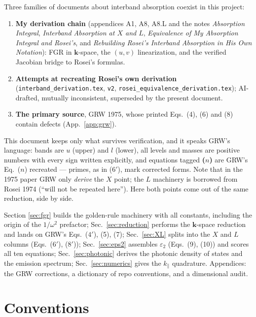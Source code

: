 \documentclass[11pt,a4paper]{article}
\numberwithin{equation}{section}
\newcommand{\kpar}{k_{\parallel}}
\newcommand{\eps}{\varepsilon}
\begin{document}
Three families of documents about interband absorption coexist in this
project:
\begin{enumerate}
\item \textbf{My derivation chain} (appendices A1, A8, A8.L and the
      notes \emph{Absorption Integral}, \emph{Interband Absorption at
      $X$ and $L$}, \emph{Equivalence of My Absorption Integral and
      Rosei's}, and \emph{Rebuilding Rosei's Interband Absorption in
      His Own Notation}): FGR in $\mathbf{k}$-space, the $(u,v)$
      linearization, and the verified Jacobian bridge to Rosei's
      formulas.
\item \textbf{Attempts at recreating Rosei's own derivation}
      (\texttt{interband\_derivation.tex}, \texttt{v2},
      \texttt{rosei\_equivalence\_derivation.tex}); AI-drafted,
      mutually inconsistent, superseded by the present document.
\item \textbf{The primary source}, GRW 1975, whose printed Eqs.~(4),
      (6) and (8) contain defects (App.~\ref{app:grw}).
\end{enumerate}
This document keeps only what survives verification, and it speaks
GRW's language: bands are $u$ (upper) and $l$ (lower), all levels and
masses are positive numbers with every sign written explicitly, and
equations tagged \textbf{($n$)} are GRW's Eq.~($n$) recreated ---
primes, as in ($6'$), mark corrected forms.  Note that in the 1975
paper GRW only \emph{derive} the $X$ point; the $L$ machinery is
borrowed from Rosei 1974 (``will not be repeated here'').  Here both
points come out of the same reduction, side by side.

Section \ref{sec:fgr} builds the golden-rule machinery with all
constants, including the origin of the $1/\omega^2$ prefactor;
Sec.~\ref{sec:reduction} performs the $\mathbf{k}$-space reduction and
lands on GRW's Eqs.~($4'$), (5), (7); Sec.~\ref{sec:XL} splits into
the $X$ and $L$ columns (Eqs.~($6'$), ($8'$)); Sec.~\ref{sec:eps2}
assembles $\eps_2$ (Eqs.~(9), (10)) and scores all ten equations;
Sec.~\ref{sec:photonic} derives the photonic density of states and the
emission spectrum; Sec.~\ref{sec:numerics} gives the $\kpar$
quadrature.  Appendices: the GRW corrections, a dictionary of repo
conventions, and a dimensional audit.

\section{Conventions}\label{sec:conv}
\end{document}
